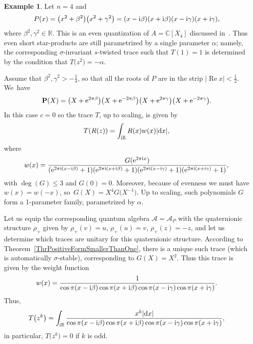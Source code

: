 \documentclass[pdftex]{sigma}
\newcommand{\mc}[1]{\mathcal{#1}}
\renewcommand{\Re}{\operatorname{Re}}
\theoremstyle{definition}
\newtheorem{Example}[Theorem]{Example}
\numberwithin{equation}{section}
\begin{document}
\begin{Example}
Let $n=4$ and
\[
P(x)=\big(x^2+\beta^2\big)\big(x^2+\gamma^2\big)=(x-{\rm i}\beta )(x+{\rm i}\beta )(x-{\rm i}\gamma)(x+{\rm i}\gamma),
\]
where $\beta^2,\gamma^2\in \mathbb R$.
This is an even quantization of $A=\mathbb C[X_4]$ discussed in~\cite[Section~6.4]{BPR}. Thus even short star-products are still parametrized by a single parameter $\alpha$; namely, the corresponding $\sigma$-invariant $s$-twisted trace such that $T(1)=1$
is determined by the condition that $T\big(z^2\big)=-\alpha$.

Assume that $\beta^2,\gamma^2>-\frac{1}{4}$, so that all the roots of $P$ are in the strip $|\Re x|<\frac{1}{2}$. We~have
\[
\mathbf{P}(X)=\big(X+{\rm e}^{2\pi \beta}\big)\big(X+{\rm e}^{-2\pi \beta}\big)\big(X+{\rm e}^{2\pi \gamma}\big)\big(X+{\rm e}^{-2\pi \gamma}\big).
\]
In this case $c=0$ so the trace $T$, up to scaling, is given by
\[
T(R(z))=\int_{{\rm i}\mathbb R}R(x)w(x)|{\rm d}x|,
\]
where
\[
w(x)=\frac{G({\rm e}^{2\pi {\rm i}x})}{({\rm e}^{2\pi {\rm i}(x-{\rm i}\beta )}+1)({\rm e}^{2\pi {\rm i}(x+{\rm i}\beta )}+1)({\rm e}^{2\pi {\rm i}(x-{\rm i}\gamma)}+1)({\rm e}^{2\pi {\rm i}(x+{\rm i}\gamma)}+1)},
\]
with $\deg(G)\le 3$ and $G(0)=0$. Moreover, because of evenness we must have \mbox{$w(x)=w(-x)$}, so~$G(X)=X^4G\big(X^{-1}\big)$. Up to scaling, such polynomials $G$ form a 1-parameter family, para\-met\-ri\-zed by $\alpha$.

Let us equip the corresponding quantum algebra $\mc A=\mc A_P$ with the quaternionic structure $\rho_+$ given by $\rho_+(v)=u$, $\rho_+(u)=v$, $\rho_+(z)=-z$, and let us determine which traces are unitary
for this quaternionic structure. According to Theorem~\ref{ThrPositiveFormSmallerThanOne}, there is a unique
such trace (which is automatically $\sigma$-stable), corresponding to $G(X)=X^2$. Thus this trace is given by the weight function
\[
w(x)=\frac{1}{\cos \pi (x-{\rm i}\beta )\cos\pi(x+{\rm i}\beta )\cos \pi (x-{\rm i}\gamma)\cos\pi(x+{\rm i}\gamma)}.
\]
Thus,
\[
T\big(z^{k}\big)=\int_{{\rm i}\mathbb R}\frac{x^{k}|{\rm d}x|}{\cos \pi (x-{\rm i}\beta )\cos\pi(x+{\rm i}\beta )\cos \pi (x-{\rm i}\gamma)\cos\pi(x+{\rm i}\gamma)},
\]
in particular, $T\big(z^k\big)=0$ if $k$ is odd.


\end{Example}
\end{document}
